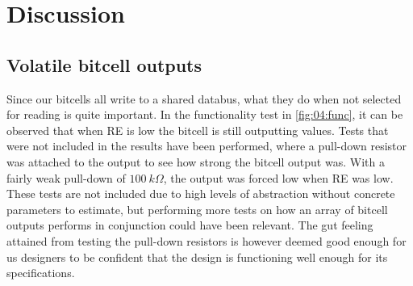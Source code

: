 \section{Discussion}    \label{sec:05:discussion}

\subsection{Volatile bitcell outputs}
Since our bitcells all write to a shared databus, what they do when not selected for reading is quite important. In the functionality test in \autoref{fig:04:func}, it can be observed that when RE is low the bitcell is still outputting values. Tests that were not included in the results have been performed, where a pull-down resistor was attached to the output to see how strong the bitcell output was. With a fairly weak pull-down of $\SI{100}{k\Omega}$, the output was forced low when RE was low. These tests are not included due to high levels of abstraction without concrete parameters to estimate, but performing more tests on how an array of bitcell outputs performs in conjunction could have been relevant. The gut feeling attained from testing the pull-down resistors is however deemed good enough for us designers to be confident that the design is functioning well enough for its specifications.

